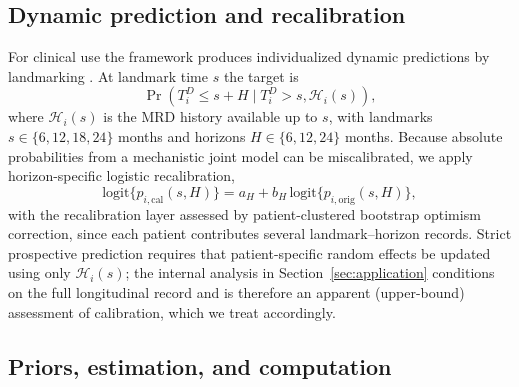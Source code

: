 \documentclass[11pt]{article}
\begin{document}
\subsection{Dynamic prediction and recalibration}
\label{sec:dynamic}

For clinical use the framework produces individualized dynamic predictions by
landmarking \cite{vanHouwelingen2007Landmarking,Rizopoulos2011DynamicPredictions}.
At landmark time $s$ the target is
\[
\Pr(T_i^D\le s+H\mid T_i^D>s,\mathcal H_i(s)),
\]
where $\mathcal H_i(s)$ is the MRD history available up to $s$, with
landmarks $s\in\{6,12,18,24\}$ months and horizons $H\in\{6,12,24\}$
months. Because absolute probabilities from a mechanistic joint model can
be miscalibrated, we apply horizon-specific logistic recalibration,
\[
\mathrm{logit}\{p_{i,\mathrm{cal}}(s,H)\}
=a_H+b_H\,\mathrm{logit}\{p_{i,\mathrm{orig}}(s,H)\},
\]
with the recalibration layer assessed by patient-clustered bootstrap optimism
correction, since each patient contributes several landmark--horizon records.
Strict prospective prediction requires that patient-specific random
effects be updated using only $\mathcal H_i(s)$; the internal analysis in
Section~\ref{sec:application} conditions on the full longitudinal record
and is therefore an apparent (upper-bound) assessment of calibration,
which we treat accordingly.

\subsection{Priors, estimation, and computation}
\label{sec:computation}
\end{document}
